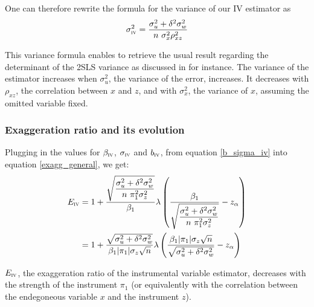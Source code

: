 \documentclass[a4paper, 11pt]{report}
\begin{document}
				One can therefore rewrite the formula for the variance of our IV estimator as 
				~
				\begin{equation*}
					\sigma_{\textsc{iv}}^{2}  = \dfrac{\sigma_{u}^{2} + \delta^{2}\sigma_{w}^{2}}{n \ \sigma_{x}^{2} \rho_{xz}^{2}}
				\end{equation*}
				
				This variance formula enables to retrieve the usual result regarding the determinant of the 2SLS variance as discussed in \cite{hansen_econometrics_2022} for instance. %
				 The variance of the estimator increases when $\sigma_u^{2}$, the variance of the error, increases. It decreases with  $\rho_{xz}$, the correlation between $x$ and $z$, and with $\sigma_{x}^{2}$, the variance of $x$, assuming the omitted variable fixed. %
				 
			\subsubsection{Exaggeration ratio and its evolution}
			
				Plugging in the values for $\beta_{\textsc{iv}}$, $\sigma_{\textsc{iv}}$ and $b_{\textsc{iv}}$, from equation \ref{b_sigma_iv} into equation \ref{exagg_general}, we get:
				~
				\begin{align*}
					E_{\textsc{iv}} & = 
					1 + 
					 \dfrac{\sqrt{\dfrac{ \sigma_{u}^{2} +  \delta^{2} \sigma_{w}^{2} }{n \ \pi_{1}^{2} \sigma_{z}^{2}}}}{\beta_{1}}
					 \lambda \left( \dfrac{\beta_{1} }{\sqrt{\dfrac{ \sigma_{u}^{2} +  \delta^{2} \sigma_{w}^{2} }{n \ \pi_{1}^{2} \sigma_{z}^{2}}}} - z_{\alpha} \right)\\
					  & = 
					1 + 
					\dfrac{\sqrt{\sigma_{u}^{2} +  \delta^{2} \sigma_{w}^{2}}}{\beta_{1}|\pi_{1}| \sigma_{z}\sqrt{n}}
					 \lambda \left( \dfrac{\beta_{1}|\pi_{1}| \sigma_{z}\sqrt{n}}{\sqrt{\sigma_{u}^{2} +  \delta^{2} \sigma_{w}^{2} }} - z_{\alpha} \right)
				\end{align*}
				
			
				\begin{proposition}
					 $E_{\textsc{iv}}$, the exaggeration ratio of the instrumental variable estimator, decreases with the strength of the instrument $\pi_{1}$ (or equivalently with the correlation between the endegoneous variable $x$ and the instrument $z$).
				\end{proposition}
				
\end{document}
